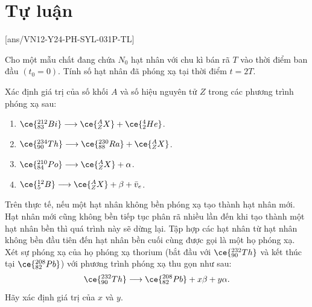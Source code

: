 \section{Tự luận}
[ans/VN12-Y24-PH-SYL-031P-TL]
\setcounter{ex}{0}
\begin{ex}
	 Cho một mẫu chất đang chứa $N_0$ hạt nhân với chu kì bán rã $T$ vào thời điểm ban đầu $\left(t_0=0\right)$. Tính số hạt nhân đã phóng xạ tại thời điểm $t=2 T$.
\end{ex}
\begin{ex}
	Xác định giá trị của số khối $A$ và số hiệu nguyên tử $Z$ trong các phương trình phóng xạ sau:
	\begin{enumerate}[label=\alph*), parsep=0.25cm]
		\item $\ce{_{83}^{212}Bi} \longrightarrow\ce{_Z^{A}X}+\ce{_2^4He}$.
		\item $\ce{_{90}^{234}Th} \longrightarrow\ce{_{88}^{230}Ra}+\ce{^A_ZX}$.
		\item $\ce{_{84}^{210}Po} \longrightarrow \ce{^A_ZX}+\alpha$.
		\item $\ce{_5^{12}B} \longrightarrow\ce{^A_ZX}+\beta+\bar{v}_{e}$.
	\end{enumerate}
\end{ex}
\begin{ex}
	Trên thực tế, nếu một hạt nhân không bền phóng xạ tạo thành hạt nhân mới. Hạt nhân mới cũng không bền tiếp tục phân rã nhiều lần đến khi tạo thành một hạt nhân bền thì quá trình này sẽ dừng lại. Tập hợp các hạt nhân từ hạt nhân không bền đầu tiên đến hạt nhân bền cuối cùng được gọi là một họ phóng xạ. Xét sự phóng xạ của họ phóng xạ thorium (bắt đầu với $\ce{_{90}^{232}Th}$ và kết thúc tại $\ce{_{82}^{208}Pb}$) với phương trình phóng xạ thu gọn như sau:
	$$\ce{_{90}^{232}Th} \longrightarrow\ce{_{82}^{208}Pb}+x \beta+y \alpha.
	$$
	Hãy xác định giá trị của $x$ và $y$.
\end{ex}

